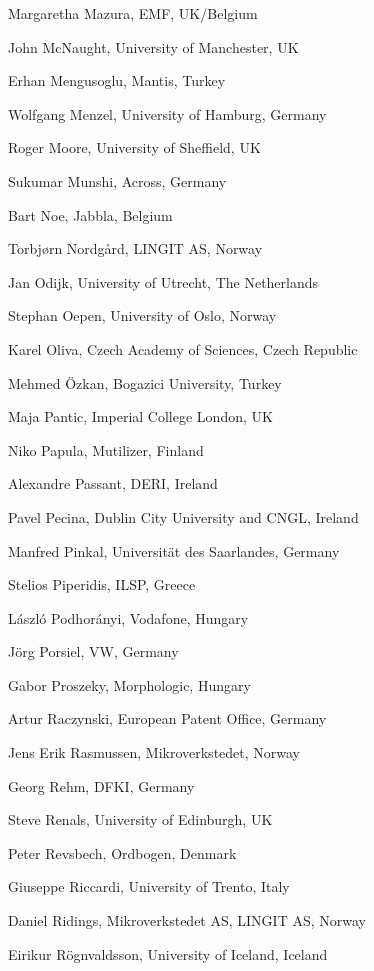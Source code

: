 \documentclass[10pt, plain]{../../metanetpaper}
\begin{document}
\begin{multicols}{3}
\begin{small}
\begin{enumerate}
{      \item Margaretha Mazura, EMF, UK/Belgium
      \item John McNaught, University of Manchester, UK
      \item Erhan Mengusoglu, Mantis, Turkey
      \item Wolfgang Menzel, University of Hamburg, Germany
      \item Roger Moore, University of Sheffield, UK
      \item Sukumar Munshi, Across, Germany
      \item Bart Noe, Jabbla, Belgium
      \item Torbjørn Nordgård, LINGIT AS, Norway
      \item Jan Odijk, University of Utrecht, The Netherlands
      \item Stephan Oepen, University of Oslo, Norway
      \item Karel Oliva, Czech Academy of Sciences, Czech Republic
      \item Mehmed Özkan, Bogazici University, Turkey
      \item Maja Pantic, Imperial College London, UK
      \item Niko Papula, Mutilizer, Finland
      \item Alexandre Passant, DERI, Ireland
      \item Pavel Pecina, Dublin City University and CNGL, Ireland
      \item Manfred Pinkal, Universität des Saarlandes, Germany
      \item Stelios Piperidis, ILSP, Greece
      \item László Podhorányi, Vodafone, Hungary
      \item Jörg Porsiel, VW, Germany
      \item Gabor Proszeky, Morphologic, Hungary
      \item Artur Raczynski, European Patent Office, Germany
      \item Jens Erik Rasmussen, Mikroverkstedet, Norway
      \item Georg Rehm, DFKI, Germany
      \item Steve Renals, University of Edinburgh, UK
      \item Peter Revsbech, Ordbogen, Denmark
      \item Giuseppe Riccardi, University of Trento, Italy
      \item Daniel Ridings, Mikroverkstedet AS, LINGIT AS, Norway
      \item Eirikur Rögnvaldsson, University of Iceland, Iceland
}
\end{enumerate}
\end{small}
\end{multicols}
\end{document}
